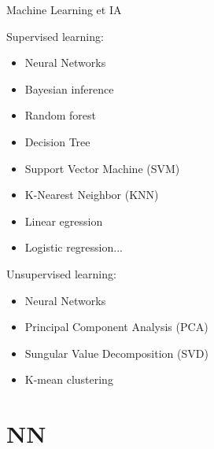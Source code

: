 \documentclass[10pt,serif,mathserif,compress,hyperref={colorlinks}]{beamer}
\begin{document}
\begin{frame}{Machine Learning et IA}

  
  \begin{tcolorbox}[title=Plusieurs approches pour les algorithmes de {\em Machine Learning}]
    {\small
      \begin{minipage}[t]{.55\textwidth}
        Supervised learning:
        \begin{itemize}
        \item Neural Networks
        \item Bayesian inference
        \item Random forest
        \item Decision Tree
        \item Support Vector Machine (SVM)
        \item K-Nearest Neighbor (KNN)
        \item Linear egression
        \item Logistic regression...
        \end{itemize}
      \end{minipage}\begin{minipage}[t]{.5\textwidth}
        Unsupervised learning:
        \begin{itemize}
        \item Neural Networks
        \item Principal Component Analysis (PCA)
        \item Sungular Value Decomposition (SVD)
        \item K-mean clustering
        \end{itemize}
      \end{minipage}
    }
  \end{tcolorbox}    
  
  
  \bigskip
\end{frame}

\section{NN}
\end{document}
